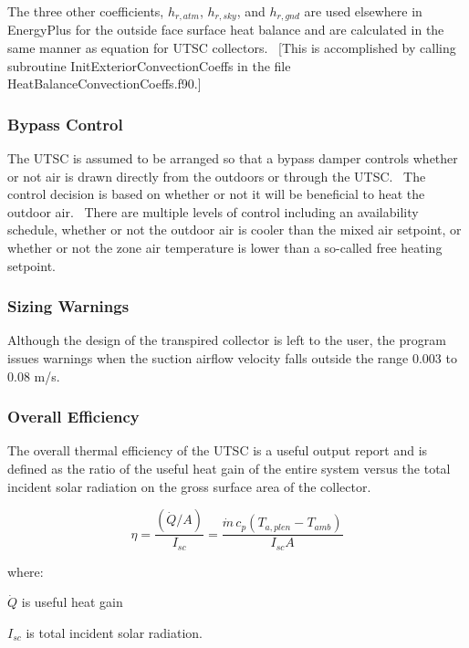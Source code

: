 The three other coefficients, \({h_{r,atm}}\), \({h_{r,sky}}\), and \({h_{r,gnd}}\) are used elsewhere in EnergyPlus for the outside face surface heat balance and are calculated in the same manner as equation for UTSC collectors.~ {[}This is accomplished by calling subroutine InitExteriorConvectionCoeffs in the file HeatBalanceConvectionCoeffs.f90.{]}

\subsubsection{Bypass Control}\label{bypass-control}

The UTSC is assumed to be arranged so that a bypass damper controls whether or not air is drawn directly from the outdoors or through the UTSC.~ The control decision is based on whether or not it will be beneficial to heat the outdoor air.~ There are multiple levels of control including an availability schedule, whether or not the outdoor air is cooler than the mixed air setpoint, or whether or not the zone air temperature is lower than a so-called free heating setpoint.

\subsubsection{Sizing Warnings}\label{sizing-warnings}

Although the design of the transpired collector is left to the user, the program issues warnings when the suction airflow velocity falls outside the range 0.003 to 0.08 m/s.

\subsubsection{Overall Efficiency}\label{overall-efficiency}

The overall thermal efficiency of the UTSC is a useful output report and is defined as the ratio of the useful heat gain of the entire system versus the total incident solar radiation on the gross surface area of the collector.

\begin{equation}
\eta  = \frac{{(\dot Q/A)}}{{{I_{sc}}}} = \frac{{\dot m\,{c_p}\left( {{T_{a,plen}} - {T_{amb}}} \right)}}{{{I_{sc}}A}}
\end{equation}

where:

\(\dot Q\) is useful heat gain

\({I_{sc}}\) is total incident solar radiation.


